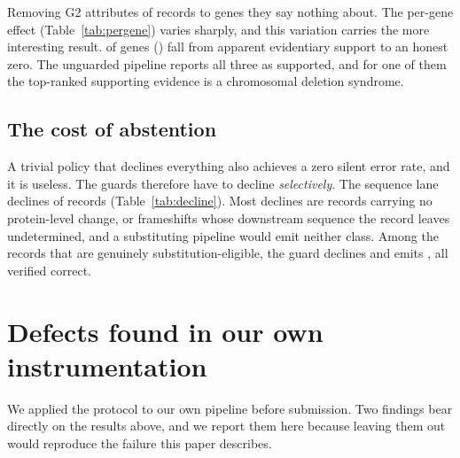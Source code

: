 \documentclass{article}
\begin{document}
Removing G2 attributes \GTwoWrong{} of \GTwoNaive{} records to genes they say
nothing about. The per-gene effect (Table~\ref{tab:pergene}) varies sharply,
and this variation carries the more interesting result. \GTwoZeroed{} of
\NumGenes{} genes (\GTwoZeroedNames{}) fall from apparent evidentiary support
to an honest zero. The unguarded pipeline reports all three as supported, and
for one of them the top-ranked supporting evidence is a chromosomal deletion
syndrome.

\begin{table}[h]
\centering
\caption{Per-gene effect of G2. $^{*}$ marks genes reduced to zero.}
\label{tab:pergene}
\PerGeneTable
\end{table}

\subsection{The cost of abstention}

A trivial policy that declines everything also achieves a zero silent error
rate, and it is useless. The guards therefore have to decline
\emph{selectively}. The sequence lane declines \SeqDeclined{} of
\GOneProcessed{} records (Table~\ref{tab:decline}). Most declines are records
carrying no protein-level change, or frameshifts whose downstream sequence the
record leaves undetermined, and a substituting pipeline would emit neither
class. Among the records that are genuinely substitution-eligible, the guard
declines \GOneWrong{} and emits \GOneEmits{}, all verified correct.

\begin{table}[h]
\centering
\caption{Why the sequence lane declines. Only \emph{residue mismatch} covers
records that a substituting pipeline would otherwise have emitted.}
\label{tab:decline}
\DeclineTable
\end{table}

\section{Defects found in our own instrumentation}
\label{sec:audit}

We applied the protocol to our own pipeline before submission. Two findings
bear directly on the results above, and we report them here because leaving
them out would reproduce the failure this paper describes.
\end{document}
